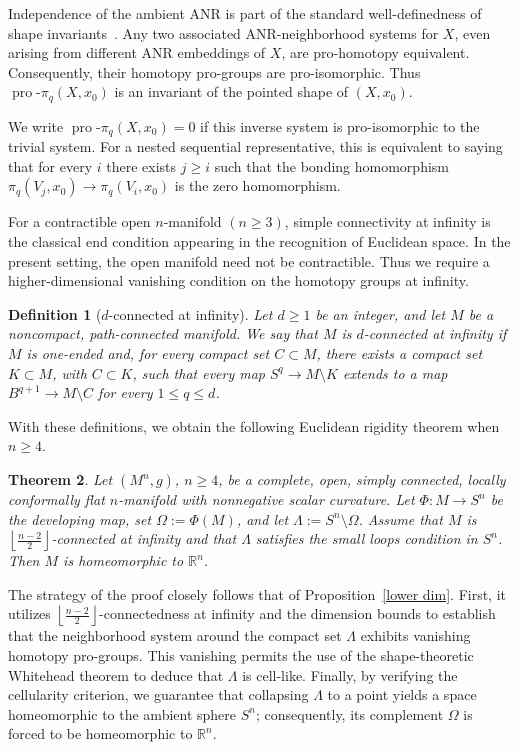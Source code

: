 \documentclass[12pt,oneside,a4paper]{article}
\newtheorem{definition}{Definition}[section]
\theoremstyle{mytheorem}
\newtheorem{theorem}[definition]{Theorem}
\theoremstyle{remark}
\theoremstyle{definition}
\begin{document}
Independence of the ambient ANR is part of the standard well-definedness of
shape invariants~\cite[Sections~2.2 and~7]{zbMATH07436589}. Any two associated ANR-neighborhood systems for \(X\), even
arising from different ANR embeddings of \(X\), are pro-homotopy equivalent.
Consequently, their homotopy pro-groups are pro-isomorphic. Thus
\(\operatorname{pro}\text{-}\pi_q(X,x_0)\) is an invariant of the pointed shape
of \((X,x_0)\).

We write $\operatorname{pro}\text{-}\pi_q(X,x_0)=0$
if this inverse system is pro-isomorphic to the trivial system. For a nested
sequential representative, this is equivalent to saying that for every \(i\)
there exists \(j\ge i\) such that the bonding homomorphism $\pi_q(V_j,x_0)\to \pi_q(V_i,x_0)$ is the zero homomorphism.

For a contractible open $n$-manifold $(n\geq 3)$, simple connectivity at infinity is the
classical end condition appearing in the recognition of Euclidean space.
In the present setting, the open manifold need not be contractible.
Thus we require a higher-dimensional vanishing condition on the homotopy
groups at infinity.

\begin{definition}[\(d\)-connected at infinity]
Let \(d\geq1\) be an integer, and let \(M\) be a noncompact, path-connected
manifold. We say that \(M\) is
\emph{\(d\)-connected at infinity} if \(M\) is one-ended and, for every compact
set \(C\subset M\), there exists a compact set \(K\subset M\), with
\(C\subset K\), such that every map
$S^q\to M\setminus K$
extends to a map $B^{q+1}\to M\setminus C$
for every \(1\le q\le d\).
\end{definition}

With these definitions, we obtain the following Euclidean rigidity theorem
when \(n\geq4\).

\begin{theorem}\label{d-connect}
Let \((M^n,g)\), \(n\geq4\), be a complete, open, simply connected, locally
conformally flat \(n\)-manifold with nonnegative scalar curvature. Let
\(\Phi\colon M\to S^n\) be the developing map, set
\(\Omega:=\Phi(M)\), and let \(\Lambda:=S^n\setminus\Omega\).
Assume that \(M\) is \(\left\lfloor \frac{n-2}{2}\right\rfloor\)-connected at infinity and that \(\Lambda\) satisfies the small loops condition in \(S^n\). Then
\(M\) is homeomorphic to \(\mathbb{R}^n\).
\end{theorem}

The strategy of the proof closely follows that of Proposition~\ref{lower dim}. First, it utilizes \(\left\lfloor \frac{n-2}{2}\right\rfloor\)-connectedness at infinity and the dimension bounds to establish that the neighborhood system around the compact set $\Lambda$ exhibits vanishing homotopy pro-groups. This vanishing permits the use of the shape-theoretic Whitehead theorem to deduce that $\Lambda$ is cell-like. Finally, by verifying the cellularity criterion, we guarantee that collapsing $\Lambda$ to a point yields a space homeomorphic to the ambient sphere $S^n$; consequently, its complement $\Omega$ is forced to be homeomorphic to $\mathbb R^n$.
\end{document}
